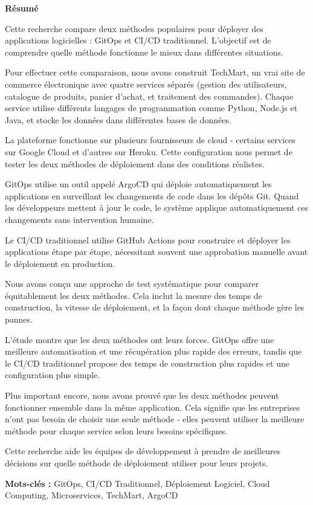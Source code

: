 \thispagestyle{empty}
\vspace*{\fill}

\begin{center}
{\Large \textbf{Résumé}}
\end{center}

\vspace{1cm}

Cette recherche compare deux méthodes populaires pour déployer des applications logicielles : GitOps et CI/CD traditionnel. L'objectif est de comprendre quelle méthode fonctionne le mieux dans différentes situations.

Pour effectuer cette comparaison, nous avons construit TechMart, un vrai site de commerce électronique avec quatre services séparés (gestion des utilisateurs, catalogue de produits, panier d'achat, et traitement des commandes). Chaque service utilise différents langages de programmation comme Python, Node.js et Java, et stocke les données dans différentes bases de données.

La plateforme fonctionne sur plusieurs fournisseurs de cloud - certains services sur Google Cloud et d'autres sur Heroku. Cette configuration nous permet de tester les deux méthodes de déploiement dans des conditions réalistes.

GitOps utilise un outil appelé ArgoCD qui déploie automatiquement les applications en surveillant les changements de code dans les dépôts Git. Quand les développeurs mettent à jour le code, le système applique automatiquement ces changements sans intervention humaine.

Le CI/CD traditionnel utilise GitHub Actions pour construire et déployer les applications étape par étape, nécessitant souvent une approbation manuelle avant le déploiement en production.

Nous avons conçu une approche de test systématique pour comparer équitablement les deux méthodes. Cela inclut la mesure des temps de construction, la vitesse de déploiement, et la façon dont chaque méthode gère les pannes.

L'étude montre que les deux méthodes ont leurs forces. GitOps offre une meilleure automatisation et une récupération plus rapide des erreurs, tandis que le CI/CD traditionnel propose des temps de construction plus rapides et une configuration plus simple.

Plus important encore, nous avons prouvé que les deux méthodes peuvent fonctionner ensemble dans la même application. Cela signifie que les entreprises n'ont pas besoin de choisir une seule méthode - elles peuvent utiliser la meilleure méthode pour chaque service selon leurs besoins spécifiques.

Cette recherche aide les équipes de développement à prendre de meilleures décisions sur quelle méthode de déploiement utiliser pour leurs projets.


\textbf{Mots-clés :} GitOps, CI/CD Traditionnel, Déploiement Logiciel, Cloud Computing, Microservices, TechMart, ArgoCD

\vspace*{\fill}
\newpage